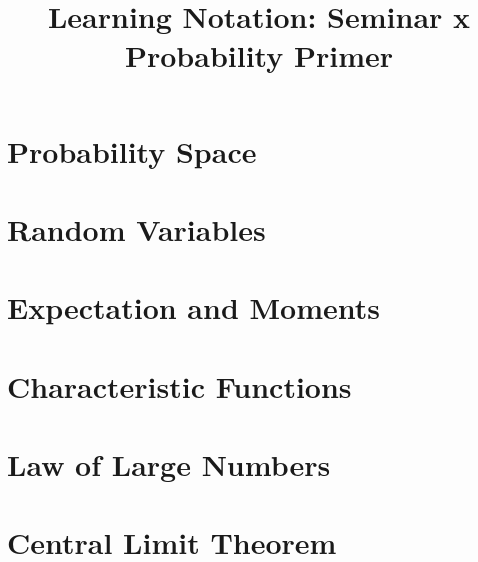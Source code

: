 \documentclass{article}[12pt]
\title{Learning Notation: Seminar x \\ Probability Primer}
\author{}
\date{}
\begin{document}
    \maketitle
    
    \section{Probability Space}
    
    \section{Random Variables}
    
    \section{Expectation and Moments}
    
    \section{Characteristic Functions}
    
    \section{Law of Large Numbers}
    
    \section{Central Limit Theorem}
    
\end{document}

